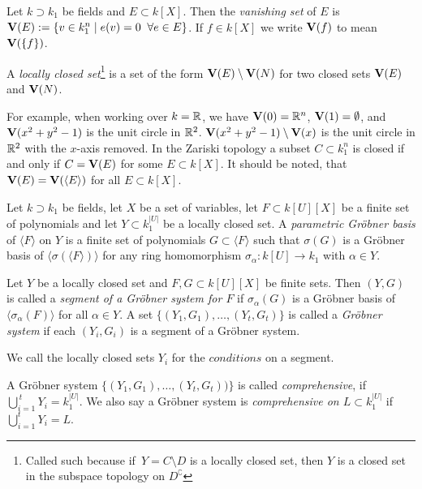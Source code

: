 \begin{definition}
  Let $k \supset k_{1}$ be fields and $E \subset k[X]$. Then the \textit{vanishing set} of $E$ is $\operatorname{\mathbf V}(E) := \{v \in k_{1}^{n} \mid e(v) = 0 \;\; \forall e \in E\}$.  If $f \in k[X]$ we write $\operatorname{\mathbf V}(f)$ to mean $\operatorname{\mathbf V}(\{f\})$.

  A \textit{locally closed set}\footnote{Called such because if $\,Y = C \setminus D$ is a locally closed set, then $Y$ is a closed set in the subspace topology on $D^{\complement}$} is a set of the form $\operatorname{\mathbf V}(E) \setminus \operatorname{\mathbf V}(N)$ for two closed sets $\operatorname{\mathbf V}(E)$ and $\operatorname{\mathbf V}(N)$.
\end{definition}

For example, when working over $k = \mathbb{R}$, we have $\operatorname{\mathbf V}(0) = \mathbb{R}^{n}$, $\operatorname{\mathbf V}(1) = \emptyset$, and $\operatorname{\mathbf V}(x^{2} + y^{2} - 1)$ is the unit circle in $\mathbb{R}^{2}$. $\operatorname{\mathbf V}(x^{2} + y^{2} - 1) \setminus \operatorname{\mathbf V}(x)$ is the unit circle in $\mathbb{R}^{2}$ with the  $x$-axis removed. In the Zariski topology a subset $C \subset k_{1}^{n}$ is closed if and only if $C = \operatorname{\mathbf V}(E)$ for some $E \subset k[X]$. It should be noted, that $\operatorname{\mathbf V}(E) = \operatorname{\mathbf V}(\langle E \rangle)$ for all $E \subset k[X]$.

\begin{definition}
  Let $k \supset k_{1}$ be fields, let $X$ be a set of variables, let $F \subset k[U][X]$ be a finite set of polynomials and let $Y \subset k_{1}^{|U|}$ be a locally closed set. A \textit{parametric Gröbner basis} of $\langle F \rangle$ on $Y$ is a finite set of polynomials $G \subset \langle F \rangle$ such that $\sigma(G)$ is a Gröbner basis of $\langle \sigma(\langle F \rangle) \rangle$ for any ring homomorphism $\sigma_{\alpha} : k[U] \to k_{1}$ with $\alpha \in Y$.
\end{definition}
\begin{definition}
  Let $Y$ be a locally closed set and $F, G \subset k[U][X]$ be finite sets. Then $(Y, G)$ is called a \textit{segment of a Gröbner system for $F$} if $\sigma_{\alpha}(G)$ is a Gröbner basis of $\langle \sigma_{\alpha}(F) \rangle$ for all $\alpha \in Y$. A set $\{(Y_{1}, G_{1}), \dots, (Y_{t}, G_{t})\}$ is called a \textit{Gröbner system} if each $(Y_{i}, G_{i})$ is a segment of a Gröbner system.

  We call the locally closed sets $Y_{i}$ for the $\textit{conditions}$ on a segment.

  A Gröbner system $\{(Y_{1}, G_{1}), \dots, (Y_{t}, G_{t}))\}$ is called \textit{comprehensive}, if $\bigcup_{i=1}^{\,t}Y_{i} = k_{1}^{|U|}$. We also say a Gröbner system is \textit{comprehensive on $L \subset k_{1}^{|U|}$} if $\bigcup_{i=1}^{t}Y_{i} = L$.
\end{definition}

